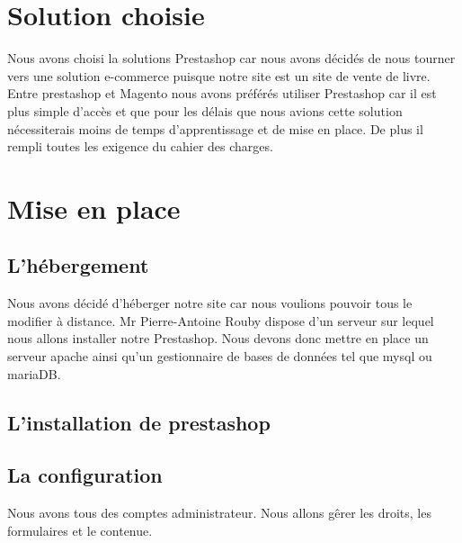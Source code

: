 \documentclass[a4paper,12pt]{report}
\begin{document}
\chapter{Solution choisie}
Nous avons choisi la solutions Prestashop car nous avons décidés de
nous tourner vers une solution e-commerce puisque notre site est un
site de vente de livre.  Entre prestashop et Magento nous avons
préférés utiliser Prestashop car il est plus simple d'accès et que
pour les délais que nous avions cette solution nécessiterais moins de
temps d'apprentissage et de mise en place. De plus il rempli toutes
les exigence du cahier des charges.

\chapter{Mise en place}
\section{L'hébergement}
Nous avons décidé d’héberger notre site car nous voulions pouvoir tous
le modifier à distance. Mr Pierre-Antoine Rouby dispose d'un serveur
sur lequel nous allons installer notre Prestashop. Nous devons donc
mettre en place un serveur apache ainsi qu'un gestionnaire de bases de
données tel que mysql ou mariaDB.

\section{L'installation de prestashop}


\section{La configuration}
Nous avons tous des comptes administrateur.
Nous allons gêrer les droits, les formulaires et le contenue.
\end{document}
